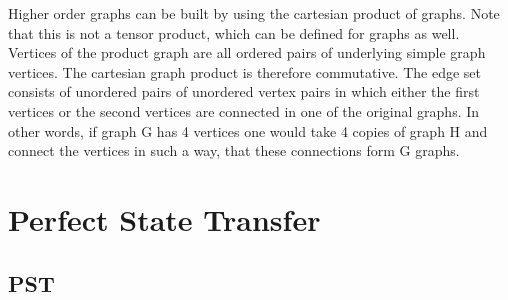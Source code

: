\begin{center}
\end{center}

\noindent Higher order graphs can be built by using the cartesian product of graphs\cite{Sabidussi1959}. Note that this is not a tensor product, which can be defined for graphs as well. Vertices of the product graph are all ordered pairs of underlying simple graph vertices. The cartesian graph product is therefore commutative. The edge set consists of unordered pairs of unordered vertex pairs in which either the first vertices or the second vertices are connected in one of the original graphs. In other words, if graph G has 4 vertices one would take 4 copies of graph H and connect the vertices in such a way, that these connections form G graphs. 


\section{Perfect State Transfer}
\subsection{PST}

\begin{center}
\end{center}

